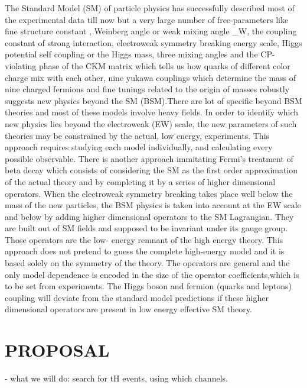 \documentclass[final,3p]{CSP}
\begin{document}
The Standard Model (SM) of particle physics has successfully described most of the experimental data till now but a very large number of
free-parameters like fine structure constant \alpha, Weinberg angle or weak mixing angle \theta_W, the coupling constant of strong 
interaction, electroweak symmetry breaking energy scale, Higgs potential self coupling or the Higgs mass, three mixing angles and the 
CP-violating phase of the CKM matrix which tells us how quarks of different color charge mix with each other, nine yukawa couplings 
which determine the mass of nine charged fermions and fine tunings related to the origin of masses robustly suggests new physics beyond 
the SM (BSM).There are lot of specific beyond BSM theories and most of these models involve heavy fields. In order to identify which new 
physics lies beyond the electroweak (EW) scale, the new parameters of such theories may be constrained by the actual, low energy, 
experiments. This approach requires studying each model individually, and calculating every possible observable. There is another 
approach immitating Fermi’s treatment of beta decay which consists of considering the SM as the first order approximation of the actual 
theory and by completing it by a series of higher dimensional operators. When the electroweak symmetry breaking takes place well below 
the mass of the new particles, the BSM physics is taken into account at the EW scale and below by adding higher dimensional operators to 
the SM Lagrangian. They are built out of SM fields and supposed to be invariant under its gauge group. Those operators are the low-
energy remnant of the high energy theory. This approach does not pretend to guess the complete high-energy model and it is based solely 
on the symmetry of the  theory. The operators are general and the only model dependence is encoded in the size of the operator 
coefficients,which is to be set from experiments. The Higgs boson and fermion (quarks and leptons) coupling will deviate from the 
standard model predictions if these higher dimensional operators are present in low energy effective SM theory. 









\section{PROPOSAL}
- what we will do:  search for tH events, using which channels.
\end{document}
